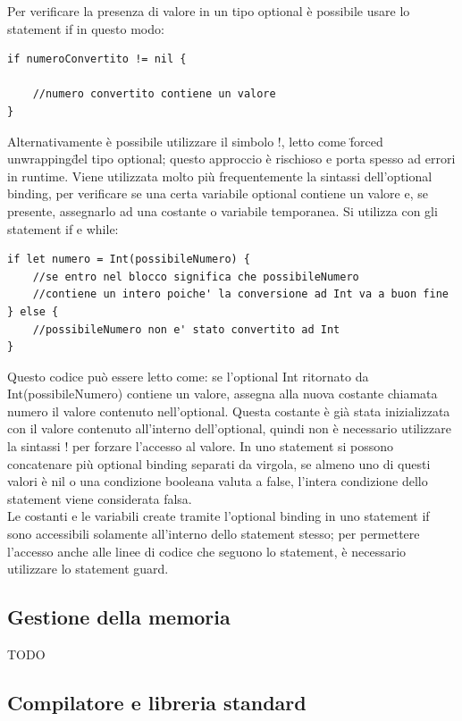 Per verificare la presenza di valore in un tipo optional è possibile usare lo statement if in questo modo: 
\lstset{language=[Objective]C, breakindent=40pt, breaklines}
\begin{lstlisting}
if numeroConvertito != nil {

	//numero convertito contiene un valore
}
\end{lstlisting}
Alternativamente è possibile utilizzare il simbolo !, letto come \"forced unwrapping\"  del tipo optional; questo approccio è rischioso e porta spesso ad errori in runtime.
Viene utilizzata molto più frequentemente la sintassi dell'optional binding, per verificare se una certa variabile optional contiene un valore e, se presente, assegnarlo ad una costante o variabile temporanea. Si utilizza con gli statement if e while:
\begin{lstlisting}
if let numero = Int(possibileNumero) {
	//se entro nel blocco significa che possibileNumero 
	//contiene un intero poiche' la conversione ad Int va a buon fine
} else {
	//possibileNumero non e' stato convertito ad Int
}
\end{lstlisting}
Questo codice può essere letto come: se l'optional Int ritornato da Int(possibileNumero) contiene un valore, assegna alla nuova costante chiamata numero il valore contenuto nell'optional. Questa costante è già stata inizializzata con il valore contenuto all'interno dell'optional, quindi non è necessario utilizzare la sintassi ! per forzare l'accesso al valore. In uno statement si possono concatenare più optional binding separati da virgola, se almeno uno di questi valori è nil o una condizione booleana valuta a false, l'intera condizione dello statement viene considerata falsa.\\
Le costanti e le variabili create tramite l'optional binding in uno statement if sono accessibili solamente all'interno dello statement stesso; per permettere l'accesso anche alle linee di codice che seguono lo statement, è necessario utilizzare lo statement guard. 
\subsection{Gestione della memoria}
TODO
\subsection{Compilatore e libreria standard}
